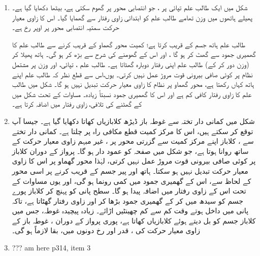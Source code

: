 \begin{enumerate}[1.]
\item
 \quad
شکل  میں ایک طالب علم   تپائی  پر ، جو انتصابی محور پر گھوم سکتی ہے، بیٹھا دکھایا گیا ہے۔ پھیلے  ہاتھوں میں   وزن تھامے طالب علم کو ابتدائی زاوی رفتار  سے گھمایا گیا۔ اس کا زاوی معیار حرکت سمتیہ  انتصابی محور پر اوپر رخ ہے۔

طالب علم ہاتھ جسم کے قریب کرتا ہے؛ کمیت محور گھماو کے قریب کرنے سے    طالب علم  کا گھمیری جمود  سے گھٹ کر  ہو گا ، اور اس کے گھومنے کی شرح  سے  بڑھ کر  ہو گی۔  ہاتھ  پھیلا کر (وزن دور کر کے)  طالب علم اپنی رفتار  دوبارہ گھٹاتا ہے۔
 طالب علم ، تپائی، اور وزن  پر مشتمل نظام پر کوئی صافی بیرونی قوت مروڑ عمل نہیں کرتی۔ یوں،اس سے قطع نظر کہ طالب علم اپنے ہاتھ کہاں رکھتا ہے،  محور گھماو پر  نظام  کا  زاوی معیار حرکت تبدیل نہیں ہو گا۔ شکل  میں  طالب علم کا زاوی رفتار  کافی کم ہے اور اس کا گھمیری جمود    نسبتاً زیادہ۔ مساوات   کے تحت شکل  میں     کے گھٹنے  کی تلافی،   زاوی رفتار  میں اضافہ کرتا ہے۔
 \item
 \quad
 شکل  میں کمانی دار تختہ سے غوطہ باز      ڈیڑھ کلابازیاں کھاتا دکھایا گیا ہے۔ جیسا آپ توقع کر سکتے ہیں، اس کا  مرکز کمیت قطع مکافی راہ پر چلتا ہے۔ کمانی دار تختے سے   ،  کلاباز  اپنے  مرکز کمیت  سے گزرتی محور  پر ، غیر   مبہم زاوی معیار حرکت   کے ساتھ روانا ہوتا ہے، جو شکل  میں صفحہ کو عمود دار ہو گا۔ پرواز کے دوران کلاباز پر کوئی صافی بیرونی قوت مروڑ عمل نہیں کرتی، لہٰذا  محور گھماو پر اس کا زاوی معیار حرکت تبدیل نہیں ہو سکتا۔ ہاتھ اور پیر جسم کے قریب کرنے پر اسی محور کے لحاظ سے، اس کے  گھمیری جمود   میں کمی رونما ہو گی،  اور یوں مساوات  کے تحت  اس کے  زاوی رفتار  میں اضافہ پیدا ہو گا۔ سطح پانی کو پہنچ کر کلاباز  پورے جسم کو سیدھ میں کر کے   گھمیری جمود بڑھا کر اور زاوی رفتار گھٹاتا ہے، تاکہ پانی میں  داخل ہوتے وقت کم سے کم چھینٹیں اڑائے۔ زیادہ پیچیدہ غوطہ،  جس میں کلاباز جسم کو بل دیتے ہوئے کلابازیاں کھاتا ہے، پوری پرواز    کے دوران ، غوطہ باز کے زاوی معیار حرکت  کی ، قدر اور رخ دونوں میں، بقا لازماً ہو گی۔
 \item
 ??? am here p314, item 3
 \end{enumerate}
 
